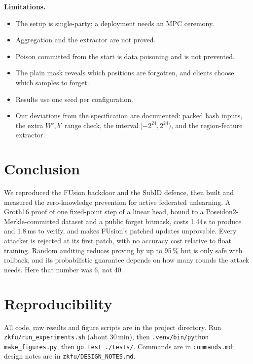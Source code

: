 \documentclass[conference]{IEEEtran}
\newcommand{\code}[1]{\texttt{\small #1}}
\begin{document}
\textbf{Limitations.}
\begin{itemize}
\item The setup is single-party; a deployment needs an MPC ceremony.
\item Aggregation and the extractor are not proved.
\item Poison committed from the start is data poisoning and is not prevented.
\item The plain mask reveals which positions are forgotten, and clients choose which samples to
forget.
\item Results use one seed per configuration.
\item Our deviations from the specification are documented: packed hash inputs, the extra
$W',b'$ range check, the interval $[-2^{24},2^{24})$, and the region-feature extractor.
\end{itemize}

\section{Conclusion}
We reproduced the FUsion backdoor and the SubID defence, then built and measured the
zero-knowledge prevention for active federated unlearning. A Groth16 proof of one fixed-point step
of a linear head, bound to a Poseidon2-Merkle-committed dataset and a public forget bitmask, costs
1.44\,s to produce and 1.8\,ms to verify, and makes FUsion's patched updates unprovable. Every
attacker is rejected at its first patch, with no accuracy cost relative to float training. Random
auditing reduces proving by up to 95\,\% but is only safe with rollback, and its probabilistic
guarantee depends on how many rounds the attack needs. Here that number was 6, not 40.

\section*{Reproducibility}
All code, raw results and figure scripts are in the project directory. Run
\code{zkfu/run\_experiments.sh} (about 30\,min), then \code{.venv/bin/python make\_figures.py},
then \code{go test ./tests/}. Commands are in \code{commands.md}; design notes are in
\code{zkfu/DESIGN\_NOTES.md}.
\end{document}
